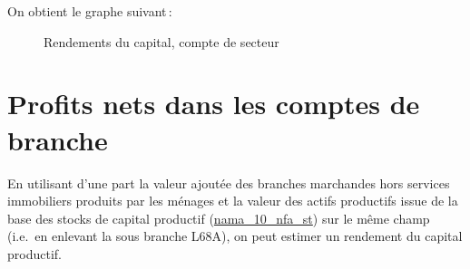 \documentclass[
  french,
  9pt,
  a4paper,
]{article}
\begin{document}
On obtient le graphe suivant\,:

\begin{figure}[H]

\caption{\label{fig-tprofitsnff}Rendements du capital, compte de
secteur}


\end{figure}%

\section{Profits nets dans les comptes de
branche}\label{profits-nets-dans-les-comptes-de-branche}

En utilisant d'une part la valeur ajoutée des branches marchandes hors
services immobiliers produits par les ménages et la valeur des actifs
productifs issue de la base des stocks de capital productif
(\href{https://ec.europa.eu/eurostat/databrowser/view/NAMA_10_NFA_ST__custom_2046386/default/table?lang=en}{nama\_10\_nfa\_st})
sur le même champ (i.e.~en enlevant la sous branche L68A), on peut
estimer un rendement du capital productif.
\end{document}
